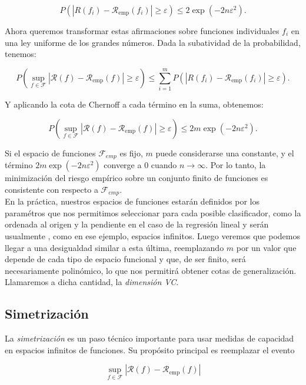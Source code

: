 \documentclass{report}
\begin{document}
\[
P\left(|R(f_i) - \mathcal{R}_{\text{emp}}(f_i)| \geq \varepsilon \right) \leq 2 \exp(-2n\varepsilon^2).
\]

Ahora queremos transformar estas afirmaciones sobre funciones individuales \(f_i\) en una ley uniforme de los 
grandes números. Dada la subatividad de la probabilidad, tenemos:

\[
P\left(\sup_{f \in \mathcal{F}} |\mathcal{R}(f) - \mathcal{R}_{\text{emp}}(f)| \geq \varepsilon \right) \leq \sum_{i=1}^m P\left(|R(f_i) - \mathcal{R}_{\text{emp}}(f_i)| \geq \varepsilon \right).
\]

Y aplicando la cota de Chernoff a cada término en la suma, obtenemos:

\begin{equation}
P\left(\sup_{f \in \mathcal{F}} |\mathcal{R}(f) - \mathcal{R}_{\text{emp}}(f)| \geq \varepsilon \right) \leq 2m \exp(-2n\varepsilon^2). \label{eq: chernoff acotada por m}
\end{equation}

Si el espacio de funciones \(\mathcal{F}_{emp}\) es fijo, \(m\) puede considerarse una 
constante, y el término \(2m \exp(-2n\varepsilon^2)\) converge a \(0\) cuando \(n \to \infty\). Por lo tanto,
la minimización del riesgo empírico sobre un conjunto finito de funciones es consistente con respecto 
a \(\mathcal{F}_{emp}\). \\

En la práctica, nuestros espacios de funciones estarán definidos por los paramétros que nos permitimos 
seleccionar para cada posible clasificador, como la ordenada al origen y la pendiente en el caso de la regresión lineal y serán usualmente
, como en ese ejemplo,
espacios infinitos. Luego veremos que podemos llegar a una desigualdad similar a esta última, reemplazando $m$ por un valor que depende
de cada tipo de espacio funcional y que, de ser finito, será necesariamente polinómico, lo que nos permitirá obtener cotas de generalización.
Llamaremos a dicha cantidad, la \textit{dimensión VC}.\newline

\subsection{Simetrización}

La \textit{simetrización} es un paso técnico importante para usar medidas de capacidad en espacios infinitos de 
funciones. Su propósito principal es reemplazar el evento 

\[
\sup_{f \in \mathcal{F}} |\mathcal{R}(f) - \mathcal{R}_{\text{emp}}(f)|
\]
\end{document}
